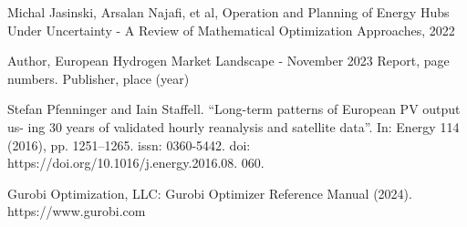 \begin{thebibliography}{}

Michal Jasinski, Arsalan Najafi, et al,
Operation and Planning of Energy Hubs Under Uncertainty - A Review of Mathematical Optimization Approaches,
2022


Author, European Hydrogen Market Landscape - November 2023 Report, page numbers. Publisher, place (year)


Stefan Pfenninger and Iain Staffell. “Long-term patterns of European PV output us-
ing 30 years of validated hourly reanalysis and satellite data”. In: Energy 114 (2016),
pp. 1251–1265. issn: 0360-5442. doi: https://doi.org/10.1016/j.energy.2016.08.
060.

Gurobi Optimization, LLC: Gurobi Optimizer Reference Manual (2024). https://www.gurobi.com




\end{thebibliography}
